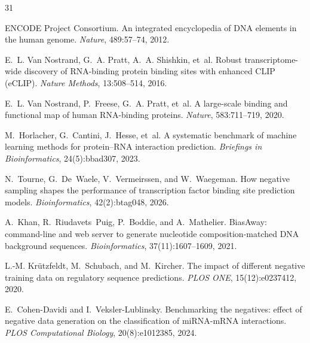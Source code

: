 \begin{thebibliography}{31}

ENCODE Project Consortium.
\newblock An integrated encyclopedia of DNA elements in the human genome.
\newblock \emph{Nature}, 489:57--74, 2012.
\newblock {}

E.~L. Van Nostrand, G.~A. Pratt, A.~A. Shishkin, et~al.
\newblock Robust transcriptome-wide discovery of RNA-binding protein binding sites with enhanced
CLIP (eCLIP).
\newblock \emph{Nature Methods}, 13:508--514, 2016.
\newblock {}

E.~L. Van Nostrand, P.~Freese, G.~A. Pratt, et~al.
\newblock A large-scale binding and functional map of human RNA-binding proteins.
\newblock \emph{Nature}, 583:711--719, 2020.
\newblock {}

M.~Horlacher, G.~Cantini, J.~Hesse, et~al.
\newblock A systematic benchmark of machine learning methods for protein--RNA interaction
prediction.
\newblock \emph{Briefings in Bioinformatics}, 24(5):bbad307, 2023.
\newblock {}

N.~Tourne, G.~De~Waele, V.~Vermeirssen, and W.~Waegeman.
\newblock How negative sampling shapes the performance of transcription factor binding site
prediction models.
\newblock \emph{Bioinformatics}, 42(2):btag048, 2026.
\newblock {}

A.~Khan, R.~Riudavets~Puig, P.~Boddie, and A.~Mathelier.
\newblock BiasAway: command-line and web server to generate nucleotide composition-matched DNA
background sequences.
\newblock \emph{Bioinformatics}, 37(11):1607--1609, 2021.
\newblock {}

L.-M. Kr\"utzfeldt, M.~Schubach, and M.~Kircher.
\newblock The impact of different negative training data on regulatory sequence predictions.
\newblock \emph{PLOS ONE}, 15(12):e0237412, 2020.
\newblock {}

E.~Cohen-Davidi and I.~Veksler-Lublinsky.
\newblock Benchmarking the negatives: effect of negative data generation on the classification
of miRNA-mRNA interactions.
\newblock \emph{PLOS Computational Biology}, 20(8):e1012385, 2024.
\newblock {}


\end{thebibliography}
